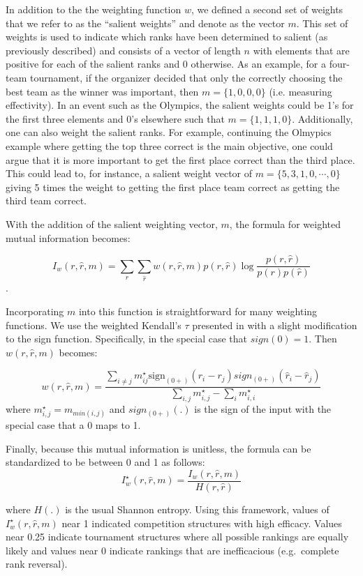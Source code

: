 \documentclass[
  12pt]{article}
\begin{document}
In addition to the the weighting function \(w\), we defined a second set
of weights that we refer to as the ``salient weights'' and denote as the
vector \(m\). This set of weights is used to indicate which ranks have
been determined to salient (as previously described) and consists of a
vector of length \(n\) with elements that are positive for each of the
salient ranks and 0 otherwise. As an example, for a four-team
tournament, if the organizer decided that only the correctly choosing
the best team as the winner was important, then \(m = \{1,0,0,0\}\)
(i.e. measuring effectivity). In an event such as the Olympics, the
salient weights could be 1's for the first three elements and 0's
elsewhere such that \(m = \{1,1,1,0\}\). Additionally, one can also
weight the salient ranks. For example, continuing the Olmypics example
where getting the top three correct is the main objective, one could
argue that it is more important to get the first place correct than the
third place. This could lead to, for instance, a salient weight vector
of \(m = \{5,3,1,0, \cdots, 0\}\) giving 5 times the weight to getting
the first place team correct as getting the third team correct.

With the addition of the salient weighting vector, \(m\), the formula
for weighted mutual information becomes:

\[
I_w(r,\hat{r},m)= \sum_{r}\sum_{\hat{r}}w(r, \hat{r}, m)p(r,\hat{r})\log \frac {p(r,\hat{r})}{p(r)p(\hat{r})}
\] .

Incorporating \(m\) into this function is straightforward for many
weighting functions. We use the weighted Kendall's \(\tau\) presented in
\citet{Shieh1998} with a slight modification to the sign function.
Specifically, in the special case that \(sign(0) = 1\). Then
\(w(r, \hat{r}, m)\) becomes:

\[
w(r, \hat{r}, m) = \frac{\sum_{i \ne j} m^{\star}_{ij}\text{sign}_{(0+)}(r_i - r_j)sign_{(0+)}(\hat{r}_i - \hat{r}_j)}{\sum_{i,j}m^{\star}_{i,j}- \sum_i m^{\star}_{i,i}}
\] where \(m^{\star}_{i,j} = m_{min(i,j)}\) and \(sign_{(0+)}(.)\) is
the sign of the input with the special case that a 0 maps to 1.

Finally, because this mutual information is unitless, the formula can be
standardized to be between 0 and 1 as follows: \[
I^{\star}_w(r,\hat{r},m) = \frac{I_w(r,\hat{r},m)}{H(r, \hat{r})}
\]

where \(H(.)\) is the usual Shannon entropy. Using this framework,
values of \(I^{\star}_w(r,\hat{r},m)\) near 1 indicated competition
structures with high efficacy. Values near 0.25 indicate tournament
structures where all possible rankings are equally likely and values
near 0 indicate rankings that are inefficacious (e.g.~complete rank
reversal).
\end{document}
